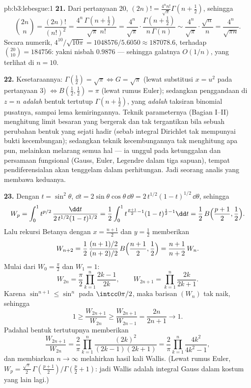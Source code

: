\begin{solution}{pb:b3:lebesgue:1}
\textbf{21.} Dari pertanyaan 20, $(2n)! =
\frac{4^nn!}{\sqrt\pi}\Gamma(n + \tfrac12)$, sehingga
\[
\binom{2n}n = \frac{(2n)!}{(n!)^2}
= \frac{4^n\,\Gamma(n+\frac12)}{\sqrt\pi\;n!}
= \frac{4^n}{\sqrt\pi}\cdot
\frac{\Gamma(n+\frac12)}{n\,\Gamma(n)}
\sim \frac{4^n}{\sqrt\pi}\cdot\frac{\sqrt n}{n}
= \frac{4^n}{\sqrt{\pi n}} .
\]
Secara numerik, $4^{10}/\sqrt{10\pi} = 1048576/5.6050 \approx
187078.6$, terhadap $\binom{20}{10} = 184756$: yakni nisbah $0.9876$
--- sehingga galatnya $O(1/n)$, yang terlihat di $n = 10$.

\textbf{22.} Kesetaraannya: $\Gamma(\frac12) = \sqrt\pi
\Leftrightarrow G = \sqrt\pi$ (lewat substitusi $x = u^2$ pada
pertanyaan 3) $\Leftrightarrow B(\frac12, \frac12) = \pi$
(lewat rumus Euler); sedangkan penggandaan di $z = n$ \emph{adalah}
bentuk tertutup $\Gamma(n + \frac12)$, yang \emph{adalah}
taksiran binomial pusatnya, sampai lema kemiringannya. Teknik
parameternya (Bagian I--II) menghitung limit besaran yang
bergerak dan tak tergantikan bila sebuah perubahan bentuk yang sejati
hadir (sebab integral Dirichlet tak mempunyai bukti kecembungan); sedangkan
teknik kecembungannya tak menghitung apa pun, melainkan melarang semua hal
--- ia unggul pada ketunggalan dan persamaan fungsional
(Gauss, Euler, Legendre dalam tiga sapuan), tempat
pendiferensialan akan tenggelam dalam perhitungan. Jadi seorang
analis yang  membawa keduanya.

\textbf{23.} Dengan $t = \sin^2\theta$, $\dd t =
2\sin\theta\cos\theta\,\dd\theta =
2\,t^{1/2}(1-t)^{1/2}\,\dd\theta$, sehingga
\[
W_p = \int_0^1 t^{p/2}\,
\frac{\dd t}{2\,t^{1/2}(1-t)^{1/2}}
= \frac12\int_0^1 t^{\frac{p+1}2 - 1}(1-t)^{\frac12 - 1}\dd t
= \frac12\,B\Bigl(\frac{p+1}2, \frac12\Bigr).
\]
Lalu rekursi Betanya dengan $x = \frac{n+1}2$ dan $y = \frac12$
memberikan
\[
W_{n+2} = \frac12\,
\frac{(n+1)/2}{(n+2)/2}\,B\Bigl(\frac{n+1}2, \frac12\Bigr)
= \frac{n+1}{n+2}\,W_n .
\]
Mulai dari $W_0 = \frac\pi2$ dan $W_1 = 1$:
\[
W_{2n} = \frac\pi2\prod_{k=1}^n\frac{2k-1}{2k},
\qquad
W_{2n+1} = \prod_{k=1}^n\frac{2k}{2k+1} .
\]
Karena $\sin^{n+1} \leq \sin^n$ pada $\intcc0{\pi/2}$, maka
barisan $(W_n)$ tak naik, sehingga
\[
1 \geq \frac{W_{2n+1}}{W_{2n}} \geq
\frac{W_{2n+1}}{W_{2n-1}} = \frac{2n}{2n+1}
\longrightarrow 1 .
\]
Padahal bentuk tertutupnya memberikan
\[
\frac{W_{2n+1}}{W_{2n}} = \frac2\pi
\prod_{k=1}^n\frac{(2k)^2}{(2k-1)(2k+1)}
= \frac2\pi\prod_{k=1}^n\frac{4k^2}{4k^2-1},
\]
dan membiarkan $n \to \infty$ melahirkan hasil kali Wallis. (Lewat
rumus Euler, $W_p = \frac{\sqrt\pi}2\,
\Gamma(\frac{p+1}2)/\Gamma(\frac p2 + 1)$: jadi Wallis adalah
integral Gauss dalam kostum yang lain lagi.)


\end{solution}
